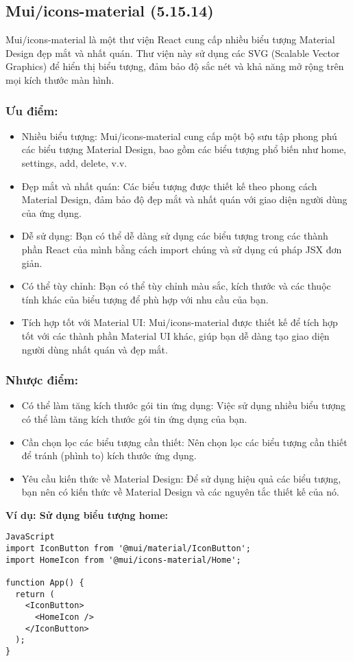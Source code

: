 \subsection{Mui/icons-material (5.15.14)}

Mui/icons-material là một thư viện React cung cấp nhiều biểu tượng Material Design đẹp mắt và nhất quán. Thư viện này sử dụng các SVG (Scalable Vector Graphics) để hiển thị biểu tượng, đảm bảo độ sắc nét và khả năng mở rộng trên mọi kích thước màn hình.

\subsubsection{Ưu điểm:}
\begin{itemize}
    \item Nhiều biểu tượng: Mui/icons-material cung cấp một bộ sưu tập phong phú các biểu tượng Material Design, bao gồm các biểu tượng phổ biến như home, settings, add, delete, v.v.
    \item Đẹp mắt và nhất quán: Các biểu tượng được thiết kế theo phong cách Material Design, đảm bảo độ đẹp mắt và nhất quán với giao diện người dùng của ứng dụng.
    \item Dễ sử dụng: Bạn có thể dễ dàng sử dụng các biểu tượng trong các thành phần React của mình bằng cách import chúng và sử dụng cú pháp JSX đơn giản.
    \item Có thể tùy chỉnh: Bạn có thể tùy chỉnh màu sắc, kích thước và các thuộc tính khác của biểu tượng để phù hợp với nhu cầu của bạn.
    \item Tích hợp tốt với Material UI: Mui/icons-material được thiết kế để tích hợp tốt với các thành phần Material UI khác, giúp bạn dễ dàng tạo giao diện người dùng nhất quán và đẹp mắt.
\end{itemize}
\subsubsection{Nhược điểm:}
\begin{itemize}
    \item Có thể làm tăng kích thước gói tin ứng dụng: Việc sử dụng nhiều biểu tượng có thể làm tăng kích thước gói tin ứng dụng của bạn.
    \item Cần chọn lọc các biểu tượng cần thiết: Nên chọn lọc các biểu tượng cần thiết để tránh (phình to) kích thước ứng dụng.
    \item Yêu cầu kiến thức về Material Design: Để sử dụng hiệu quả các biểu tượng, bạn nên có kiến thức về Material Design và các nguyên tắc thiết kế của nó.
    \end{itemize}
    \textbf{Ví dụ: Sử dụng biểu tượng home:}
\begin{lstlisting}
JavaScript
import IconButton from '@mui/material/IconButton';
import HomeIcon from '@mui/icons-material/Home';

function App() {
  return (
    <IconButton>
      <HomeIcon />
    </IconButton>
  );
}
\end{lstlisting}



